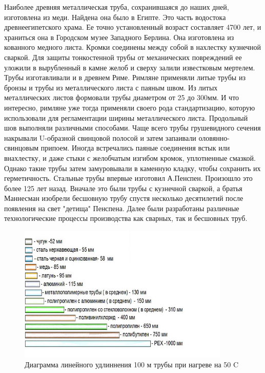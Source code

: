 \documentclass[a4paper,12pt,russian]{report}
\begin{document}
Наиболее древняя металлическая труба, сохранившаяся до наших дней, изготовлена из меди. Найдена она было в Египте. Это часть водостока древнеегипетского храма. Ее точно установленный возраст составляет 4700 лет, и храниться она в Городском музее Западного Берлина. Она изготовлена из кованного медного листа. Кромки соединены между собой в нахлестку кузнечной сваркой. Для защиты тонкостенной трубы от механических повреждений ее уложили в вырубленный в камне желоб и сверху залили известковым мертелем. Трубы изготавливали и в древнем Риме. Римляне применяли литые трубы из бронзы и трубы из металлического листа с паяным швом. Из литых металлических листов формовали трубы диаметром от 25 до 300мм. И что интересно, римляне уже тогда применяли своего рода стандартизацию, которую использовали для регламентации ширины металлического листа. Продольный шов выполняли различными способами. Чаще всего трубы грушевидного сечения накрывали U-образной свинцовой полосой и затем запаивали оловянно-свинцовым припоем. Иногда встречались паяные соединения встык или внахлестку, и даже стыки с желобчатым изгибом кромок, уплотненные смазкой. Однако такие трубы затем замуровывали в каменную кладку, чтобы сохранить их герметичность.
Стальные трубы впервые изготовил А.Пенспен. Произошло это более 125 лет назад. Вначале это были трубы с кузнечной сваркой, а братья Маннесман изобрели бесшовную трубу спустя несколько десятилетий после появления на свет "детища" Пенспена.  Далее были разработаны различные технологические процессы производства как сварных, так и бесшовных труб.

\begin{figure}[!htb]
  \centerline{\includegraphics[width=0.9\textwidth]{50}}
  \caption{Диаграмма линейного удлиннения 100 м трубы при нагреве на 50 C}
  \label{graph:50}
\end{figure}
\end{document}
